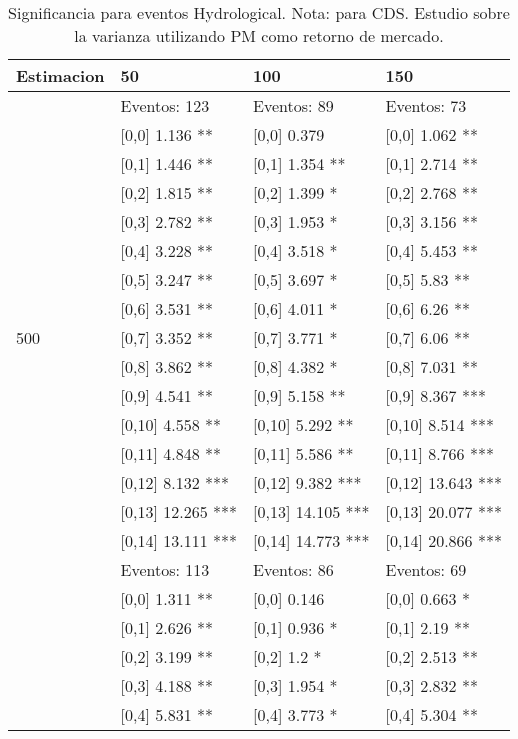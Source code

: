 \begin{table}

\caption{Significancia para eventos Hydrological. Nota: para CDS. Estudio sobre la varianza utilizando PM como retorno de mercado.}
\centering
\begin{tabular}[t]{llll}
\toprule
Estimacion & 50 & 100 & 150\\
\midrule
 & Eventos:  123 & Eventos:  89 & Eventos:  73\\
 & {}[0,0] 1.136 ** & {}[0,0] 0.379 & {}[0,0] 1.062 **\\
 & {}[0,1] 1.446 ** & {}[0,1] 1.354 ** & {}[0,1] 2.714 **\\
 & {}[0,2] 1.815 ** & {}[0,2] 1.399 * & {}[0,2] 2.768 **\\
 & {}[0,3] 2.782 ** & {}[0,3] 1.953 * & {}[0,3] 3.156 **\\
\addlinespace
 & {}[0,4] 3.228 ** & {}[0,4] 3.518 * & {}[0,4] 5.453 **\\
 & {}[0,5] 3.247 ** & {}[0,5] 3.697 * & {}[0,5] 5.83 **\\
 & {}[0,6] 3.531 ** & {}[0,6] 4.011 * & {}[0,6] 6.26 **\\
500 & {}[0,7] 3.352 ** & {}[0,7] 3.771 * & {}[0,7] 6.06 **\\
 & {}[0,8] 3.862 ** & {}[0,8] 4.382 * & {}[0,8] 7.031 **\\
\addlinespace
 & {}[0,9] 4.541 ** & {}[0,9] 5.158 ** & {}[0,9] 8.367 ***\\
 & {}[0,10] 4.558 ** & {}[0,10] 5.292 ** & {}[0,10] 8.514 ***\\
 & {}[0,11] 4.848 ** & {}[0,11] 5.586 ** & {}[0,11] 8.766 ***\\
 & {}[0,12] 8.132 *** & {}[0,12] 9.382 *** & {}[0,12] 13.643 ***\\
 & {}[0,13] 12.265 *** & {}[0,13] 14.105 *** & {}[0,13] 20.077 ***\\
\addlinespace
 & {}[0,14] 13.111 *** & {}[0,14] 14.773 *** & {}[0,14] 20.866 ***\\
 & Eventos:  113 & Eventos:  86 & Eventos:  69\\
 & {}[0,0] 1.311 ** & {}[0,0] 0.146 & {}[0,0] 0.663 *\\
 & {}[0,1] 2.626 ** & {}[0,1] 0.936 * & {}[0,1] 2.19 **\\
 & {}[0,2] 3.199 ** & {}[0,2] 1.2 * & {}[0,2] 2.513 **\\
\addlinespace
 & {}[0,3] 4.188 ** & {}[0,3] 1.954 * & {}[0,3] 2.832 **\\
 & {}[0,4] 5.831 ** & {}[0,4] 3.773 * & {}[0,4] 5.304 **\\

\end{tabular}
\end{table}
